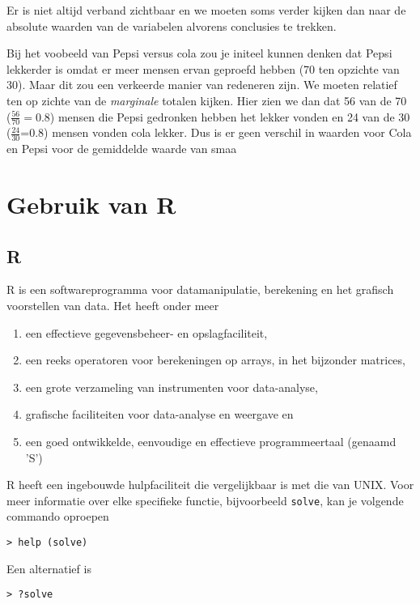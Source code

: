 Er is niet altijd verband zichtbaar en we moeten soms verder kijken dan naar de absolute waarden van de variabelen alvorens conclusies te trekken.

\begin{example}
	Bij het voobeeld van Pepsi versus cola zou je initeel kunnen denken dat Pepsi lekkerder is omdat er meer mensen ervan geproefd hebben (70 ten opzichte van 30). Maar dit zou een verkeerde manier van redeneren zijn. We moeten relatief ten op zichte van de  \textit{marginale} totalen kijken. Hier zien we dan dat 56 van de 70 ($\frac{56}{70} = 0.8$) mensen die Pepsi gedronken hebben het lekker vonden en 24 van de 30 ($\frac{24}{30}$=0.8) mensen vonden cola lekker. Dus is er geen verschil in waarden voor Cola en Pepsi voor de gemiddelde waarde van smaa 
\end{example}

\section{Gebruik van R}
\subsection{R}
R is een softwareprogramma voor datamanipulatie, berekening en het grafisch voorstellen van data. Het heeft onder meer
\begin{enumerate}
	\item een effectieve gegevensbeheer- en opslagfaciliteit,
	\item een reeks operatoren voor berekeningen op arrays, in het bijzonder matrices,
	\item een grote verzameling van instrumenten voor data-analyse,
	\item grafische faciliteiten voor data-analyse en weergave en
	\item een goed ontwikkelde, eenvoudige en effectieve programmeertaal (genaamd 'S')
\end{enumerate}

R heeft een ingebouwde hulpfaciliteit die vergelijkbaar is met die van UNIX. Voor meer informatie over elke specifieke functie, bijvoorbeeld \texttt{solve}, kan je volgende commando oproepen
\begin{lstlisting}
> help (solve)
\end{lstlisting}

Een alternatief is
\begin{lstlisting}
> ?solve
\end{lstlisting}

